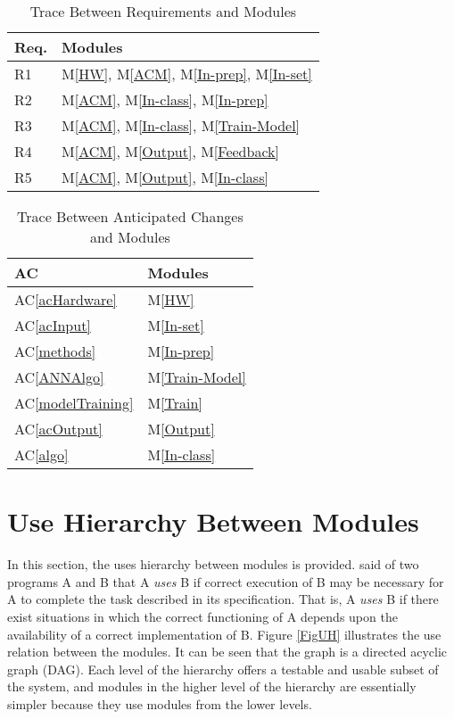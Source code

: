 \documentclass[12pt, titlepage]{article}
\newcommand{\acref}[1]{AC\ref{#1}}
\newcommand{\mref}[1]{M\ref{#1}}
\begin{document}
\begin{table}[H]
\centering
\begin{tabular}{p{} p{}}
\toprule
\textbf{Req.} & \textbf{Modules}\\
\midrule
R1 & \mref{HW}, \mref{ACM}, \mref{In-prep}, \mref{In-set}\\
R2 & \mref{ACM}, \mref{In-class}, \mref{In-prep}\\
R3 & \mref{ACM}, \mref{In-class}, \mref{Train-Model}\\
R4 & \mref{ACM}, \mref{Output}, \mref{Feedback}\\
R5 & \mref{ACM}, \mref{Output}, \mref{In-class}\\
\bottomrule
\end{tabular}
\caption{Trace Between Requirements and Modules}
\label{TblRT}
\end{table}

\begin{table}[H]
\centering
\begin{tabular}{p{} p{}}
\toprule
\textbf{AC} & \textbf{Modules}\\
\midrule
\acref{acHardware} & \mref{HW}\\
\acref{acInput} & \mref{In-set}\\
\acref{methods} & \mref{In-prep}\\
\acref{ANNAlgo} & \mref{Train-Model}\\
\acref{modelTraining} & \mref{Train}\\
\acref{acOutput} & \mref{Output}\\
\acref{algo} & \mref{In-class}\\
\bottomrule
\end{tabular}
\caption{Trace Between Anticipated Changes and Modules}
\label{TblACT}
\end{table}

\section{Use Hierarchy Between Modules} \label{SecUse}

In this section, the uses hierarchy between modules is
provided. \citet{Parnas1978} said of two programs A and B that A {\em uses} B if
correct execution of B may be necessary for A to complete the task described in
its specification. That is, A {\em uses} B if there exist situations in which
the correct functioning of A depends upon the availability of a correct
implementation of B.  Figure \ref{FigUH} illustrates the use relation between
the modules. It can be seen that the graph is a directed acyclic graph
(DAG). Each level of the hierarchy offers a testable and usable subset of the
system, and modules in the higher level of the hierarchy are essentially simpler
because they use modules from the lower levels.
\end{document}
